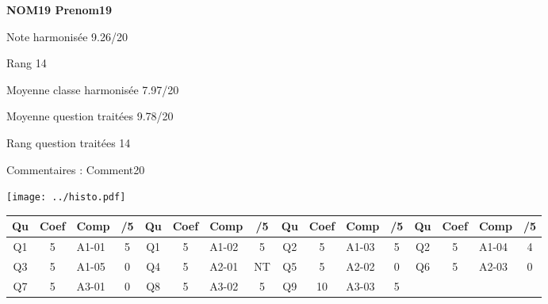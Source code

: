 \begin{minipage}[c]{.45\linewidth} 
\Large \textbf{\textsf{NOM19 Prenom19}} 
 
 \normalsize Note harmonisée 9.26/20 
 
Rang 14
 
Moyenne classe harmonisée 7.97/20 
 
Moyenne question traitées 9.78/20 
 
Rang question traitées 14 
 
Commentaires : 
Comment20 
\end{minipage}\hfill 
\begin{minipage}[c]{.45\linewidth}  
\begin{center}
\texttt{[image: ../histo.pdf]} 
\end{center}
\end{minipage}
\footnotesize 
\begin{center} 
\begin{tabular}{|c|c|m{1cm}|c||c|c|m{1cm}|c||c|c|m{1cm}|c||c|c|m{1cm}|c|} 
\hline \textbf{Qu} & \textbf{Coef} & \textbf{Comp} & \textbf{/5} & \textbf{Qu} & \textbf{Coef} & \textbf{Comp} & \textbf{/5} & \textbf{Qu} & \textbf{Coef} & \textbf{Comp} & \textbf{/5} & \textbf{Qu} & \textbf{Coef} & \textbf{Comp} & \textbf{/5} \\ 
\hline 
\hline 
Q1 & 5 & A1-01 & 5 & Q1 & 5 & A1-02 & 5 & Q2 & 5 & A1-03 & 5 & Q2 & 5 & A1-04 & 4 \\ \hline 
 
Q3 & 5 & A1-05 & 0 & Q4 & 5 & A2-01 & NT & Q5 & 5 & A2-02 & 0 & Q6 & 5 & A2-03 & 0 \\ \hline 
 
Q7 & 5 & A3-01 & 0 & Q8 & 5 & A3-02 & 5 & Q9 & 10 & A3-03 & 5 &  &  &  &  \\ \hline 
 
\end{tabular} 
\end{center} 
\normalsize 
 
